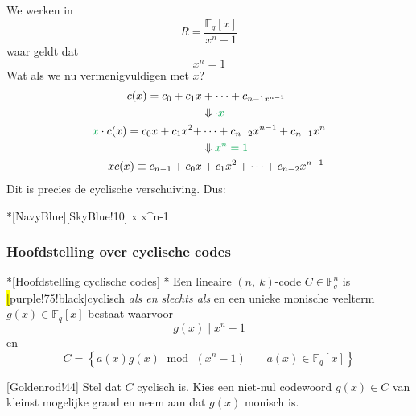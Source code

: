 We werken in
\begin{equation*}
    R = \frac{\mathbb{F}_q\left[x\right]}{x^n-1}
\end{equation*}
waar geldt dat
\begin{equation*}
    x^n=1
\end{equation*}
Wat als we nu vermenigvuldigen met $x$?
\begin{equation*}
    \begin{aligned}
        c(x) = c_0 + c_1x &+ \cdots + c_{n-1x^{n-1}} \\
        &\Downarrow \textcolor{Green}{\cdot x} \\
        \textcolor{Green}{x} \cdot c(x) = c_0x + c_1x^2 + &\cdots + c_{n-2}x^{n-1} + c_{n-1}x^n \\
        &\Downarrow \textcolor{Green}{x^n=1} \\
        xc(x) \equiv c_{n-1} + c_0x &+ c_1x^2 + \cdots + c_{n-2}x^{n-1}
    \end{aligned}
\end{equation*}
Dit is precies de cyclische verschuiving. Dus:
\begin{equationbox}*[NavyBlue][SkyBlue!10]
     \iff {} x  x^n-1
\end{equationbox}

\subsubsection{Hoofdstelling over cyclische codes}

\begin{nicetheorem}*[Hoofdstelling cyclische codes]
    \nextpart[]*
    Een lineaire $(n,\ k)$-code $C \in \mathbb{F}_q^n$ is \hl[purple!75!black]{cyclisch} \emph{als en slechts als} en een unieke monische veelterm $g(x) \in \mathbb{F}_q\left[x\right]$ bestaat waarvoor
    \begin{equation*}
        g(x) \mid x^n-1
    \end{equation*}
    en
    \begin{equation*}
        C = \left\{ a(x)g(x) \;\text{ mod }\; (x^n-1) \quad\mid a(x) \in \mathbb{F}_q\left[x\right] \right\}
    \end{equation*}
\end{nicetheorem}

[Goldenrod!44] Stel dat $C$ cyclisch is. Kies een niet-nul codewoord $g(x) \in C$ van kleinst mogelijke graad en neem aan dat $g(x)$ monisch is.

